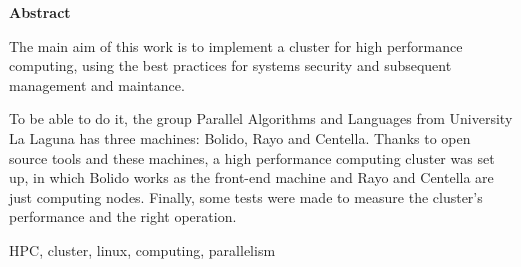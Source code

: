 \documentclass[spanish,a4paper,12pt,oneside]{extreport}
\newenvironment{summary}
{\par\noindent\begin{center}\textbf{Abstract}\end{center}\begin{itshape}\par\noindent}
{\end{itshape}}
\newenvironment{keywords}
{\begin{list}{}{\setlength{\leftmargin}{1em}}\item[\hskip\labelsep \bfseries Keywords:]}
{\end{list}}
\begin{document}
\begin{summary}
{
The main aim of this work is to implement a cluster for high performance computing, using the best practices for systems security and subsequent management and maintance. 

To be able to do it, the group Parallel Algorithms and Languages from University La Laguna has three machines: Bolido, Rayo and Centella. Thanks to open source tools and these machines, a high performance computing cluster was set up, in which Bolido works as the front-end machine and Rayo and Centella are just computing nodes. Finally, some tests were made to measure the cluster's performance and the right operation.
}

\em
\begin {keywords}
HPC, cluster, linux, computing, parallelism
\end {keywords}

\end{summary}
\newpage{\pagestyle{empty}}
\thispagestyle{empty}

\pagestyle{myheadings} %



\renewcommand{\thepage}{\roman{page}}
\setcounter{page}{1}
\pagestyle{plain} 


\tableofcontents

\newpage{\pagestyle{empty}}

\listoffigures
\lstlistoflistings

\newpage{\pagestyle{empty}}

\listoftables

\newpage{\pagestyle{empty}}

\newpage
\thispagestyle{empty}
\end{document}
